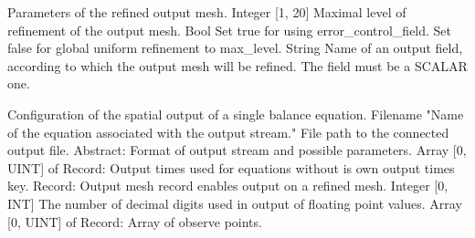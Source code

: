 \begin{RecordType}
	{}
	{} %
	{} %
	{} %
	{{{Parameters of the refined output mesh.}}}
		\KeyItem
			{}
			{{Integer [1, 20]}}
			{\textrangle}
			{} %
			{{{Maximal level of refinement of the output mesh.}}}
		\KeyItem
			{}
			{{Bool}}
			{\textrangle}
			{} %
			{{{Set true for using error{\_}control{\_}field. Set false for global uniform refinement to max{\_}level.}}}
		\KeyItem
			{}
			{{String}}
			{\textrangle}
			{} %
			{{{Name of an output field, according to which the output mesh will be refined. The field must be a SCALAR one.}}}
\end{RecordType}
\begin{RecordType}
	{}
	{} %
	{} %
	{} %
	{{{Configuration of the spatial output of a single balance equation.}}}
		\KeyItem
			{}
			{{Filename}}
			{"{Name of the equation associated with the output stream.}"}
			{} %
			{{{File path to the connected output file.}}}
		\KeyItem
			{}
			{{Abstract}{: }}
			{\textlangle{ \it{{\{}{\}}} }\textrangle}
			{} %
			{{{Format of output stream and possible parameters.}}}
		\KeyItem
			{}
			{{Array [0, UINT] of }{Record}{: }}
			{\textrangle}
			{} %
			{{{Output times used for equations without is own output times key.}}}
		\KeyItem
			{}
			{{Record}{: }}
			{\textrangle}
			{} %
			{{{Output mesh record enables output on a refined mesh.}}}
		\KeyItem
			{}
			{{Integer [0, INT]}}
			{\textrangle}
			{} %
			{{{The number of decimal digits used in output of floating point values.}}}
		\KeyItem
			{}
			{{Array [0, UINT] of }{Record}{: }}
			{\textlangle{ \it{[]} }\textrangle}
			{} %
			{{{Array of observe points.}}}
\end{RecordType}
